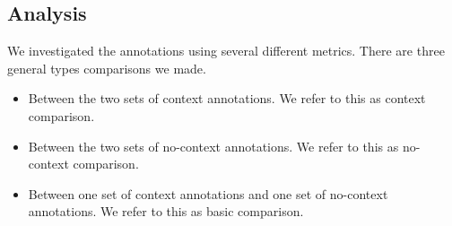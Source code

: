 \documentclass[11pt]{article}
\begin{document}
\subsection{Analysis}
We investigated the annotations using several different metrics. There are three general types comparisons we made. 

\begin{itemize}
\item Between the two sets of context annotations. We refer to this as context comparison.
\item Between the two sets of no-context annotations. We refer to this as no-context comparison. 
\item Between one set of context annotations and one set of no-context annotations. We refer to this as basic comparison.
\end{itemize}
\end{document}
